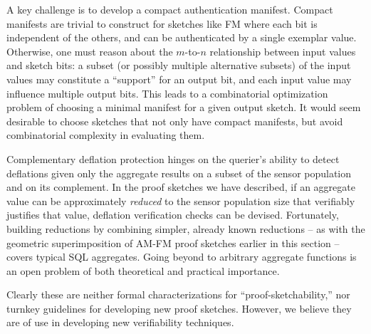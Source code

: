 \documentclass[10pt,twocolumn]{article}
\newcommand{\amfm}{AM-FM\xspace}
\newcommand{\proofsketches}{proof sketches\xspace}
\newcommand{\am}{authentication manifest\xspace}
\newcommand{\semtitle}[1]{\noindent{\em #1\/}}
\begin{document}
\vspace{2pt}

\semtitle{--Compact Manifest:} A key challenge is to develop a compact \am.  Compact manifests are
  trivial to construct for sketches like FM where each bit is
  independent of the others, and can be authenticated by a single
  exemplar value.  Otherwise, one must reason about the $m$-to-$n$
  relationship between input values and sketch bits: a subset (or
  possibly multiple alternative subsets) of the input values may
  constitute a ``support'' for an output bit, and each input value may
  influence multiple output bits.  This leads to a
  combinatorial optimization problem of choosing a
  minimal manifest for a given output sketch. It would seem desirable
  to choose sketches that not only have compact manifests, but avoid
  combinatorial complexity in evaluating them.

\vspace{2pt}

\semtitle{--Deflation Bounds:}  Complementary deflation protection hinges
on the querier's ability to detect deflations given
only the aggregate results on a subset of the sensor population and on its
complement.  In the \proofsketches we have described, if an
aggregate value can be approximately \emph{reduced} to the sensor
population size that verifiably justifies that value, deflation verification checks
can be devised.  Fortunately, building reductions by combining simpler, already
known reductions -- as with the geometric superimposition of \amfm
\proofsketches earlier in this section -- covers typical SQL aggregates.  
Going beyond to arbitrary aggregate functions is an open problem of both
theoretical and practical importance.


\vspace{2pt}

Clearly these are neither formal characterizations 
for ``proof-sketchability,'' nor turnkey guidelines for
developing new \proofsketches.  However, we believe they are of use in
developing new verifiability techniques.
\end{document}
